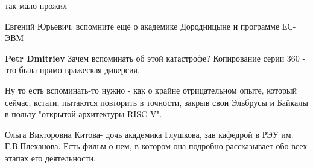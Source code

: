 \begin{itemize}

 
так мало прожил

 
Евгений Юрьевич, вспомните ещё о академике Дородницыне и программе ЕС-ЭВМ

\begin{itemize}
 
\textbf{Petr Dmitriev} Зачем вспоминать об этой катастрофе? Копирование серии 360 - это была прямо вражеская диверсия.

 
Ну то есть вспоминать-то нужно - как о крайне отрицательном опыте, который сейчас, кстати, пытаются повторить в точности, закрыв свои Эльбрусы и Байкалы в пользу "открытой архитектуры RISC V".
\end{itemize}

 

Ольга Викторовна Китова- дочь академика Глушкова, зав кафедрой в РЭУ им.
Г.В.Плеханова. Есть фильм о нем, в котором она подробно рассказывает обо всех
этапах его деятельности.

\begin{itemize}
 

\end{itemize}
\end{itemize}
